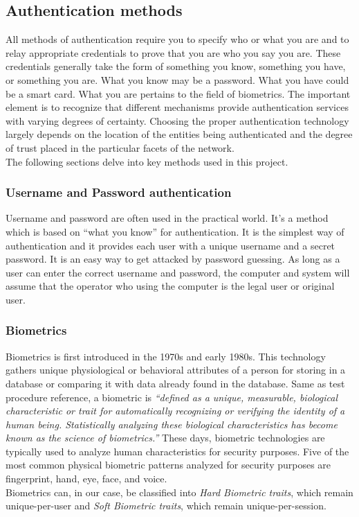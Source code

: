 \documentclass[12pt]{article}			%
\begin{document}
\subsection{ Authentication methods }
All methods of authentication require you to specify who or what you are and to relay appropriate credentials to prove that you are who you say you are. These credentials generally take the form of something you know, something you have, or something you are. What you know may be a password. What you have could be a smart card. What you are pertains to the field of biometrics. The important element is to recognize that different mechanisms provide authentication services with varying degrees of certainty. Choosing the proper authentication technology largely depends on the location of the entities being authenticated and the degree of
trust placed in the particular facets of the network.\\
The following sections delve into key methods used in this project.

\subsubsection{ Username and Password authentication }
Username and password are often used in the practical world. It’s a method which is based on “what you know” for authentication. It is the simplest way of authentication and it provides each user with a unique username and a secret password. It is an easy way to get attacked by password guessing. As long as a user can enter the correct username and password, the computer and system will assume that the operator who using the computer is the legal user or original user.

\subsubsection{ Biometrics }
Biometrics is first introduced in the 1970s and early 1980s. This technology gathers unique physiological or behavioral attributes of a person for storing in a database or comparing it with data already found in the database. Same as test procedure reference, a biometric is \emph{“defined as a unique, measurable, biological characteristic or trait for automatically recognizing or verifying the identity of a human being. Statistically analyzing these biological characteristics has become known as the science of biometrics.”} These days, biometric technologies are typically used to analyze human characteristics for security purposes. Five of the most common physical biometric patterns analyzed for security purposes are fingerprint, hand, eye, face, and voice.\\
Biometrics can, in our case, be classified into \emph{Hard Biometric traits}, which remain unique-per-user and \emph{Soft Biometric traits}, which remain unique-per-session.
\end{document}
